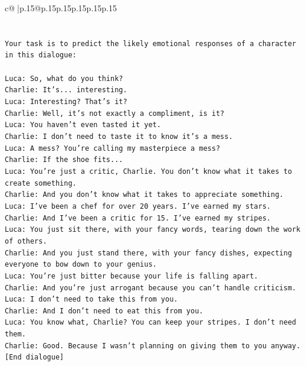 \documentclass{article}
\begin{document}
{\begin{supertabular}{c@{$\;$}|p{.15\linewidth}@{}p{.15\linewidth}p{.15\linewidth}p{.15\linewidth}p{.15\linewidth}p{.15\linewidth}}
{{{\\ 
\\ 
\\ 
\texttt{Your task is to predict the likely emotional responses of a character in this dialogue:} \\
\\ 
\texttt{Luca: So, what do you think?} \\
\texttt{Charlie: It's... interesting.} \\
\texttt{Luca: Interesting? That's it?} \\
\texttt{Charlie: Well, it's not exactly a compliment, is it?} \\
\texttt{Luca: You haven't even tasted it yet. } \\
\texttt{Charlie: I don't need to taste it to know it's a mess.} \\
\texttt{Luca: A mess? You're calling my masterpiece a mess?} \\
\texttt{Charlie: If the shoe fits...} \\
\texttt{Luca: You're just a critic, Charlie. You don't know what it takes to create something.} \\
\texttt{Charlie: And you don't know what it takes to appreciate something. } \\
\texttt{Luca: I've been a chef for over 20 years. I've earned my stars.} \\
\texttt{Charlie: And I've been a critic for 15. I've earned my stripes.} \\
\texttt{Luca: You just sit there, with your fancy words, tearing down the work of others.} \\
\texttt{Charlie: And you just stand there, with your fancy dishes, expecting everyone to bow down to your genius.} \\
\texttt{Luca: You're just bitter because your life is falling apart.} \\
\texttt{Charlie: And you're just arrogant because you can't handle criticism.} \\
\texttt{Luca: I don't need to take this from you.} \\
\texttt{Charlie: And I don't need to eat this from you.} \\
\texttt{Luca: You know what, Charlie? You can keep your stripes. I don't need them.} \\
\texttt{Charlie: Good. Because I wasn't planning on giving them to you anyway.} \\
\texttt{{[}End dialogue{]}} \\
\\ 
}}}
\end{supertabular}}
\end{document}
